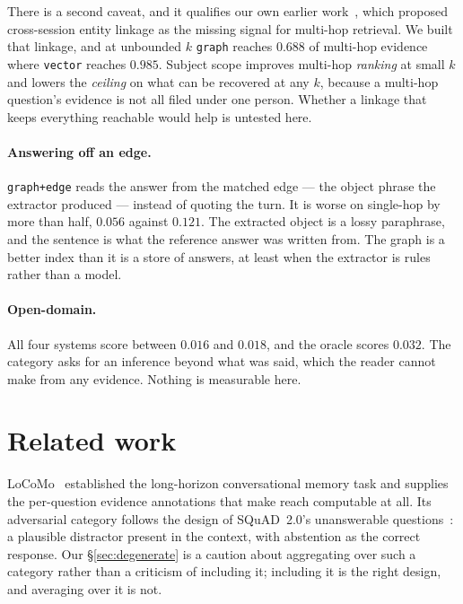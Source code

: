 \documentclass[11pt]{article}
\newcommand{\arm}[1]{\texttt{#1}}
\begin{document}
There is a second caveat, and it qualifies our own earlier
work~\cite{multihop}, which proposed cross-session entity linkage as the
missing signal for multi-hop retrieval. We built that linkage, and at unbounded
$k$ \arm{graph} reaches $0.688$ of multi-hop evidence where \arm{vector} reaches
$0.985$. Subject scope improves multi-hop \emph{ranking} at small $k$
and lowers the \emph{ceiling} on what can be recovered at any $k$, because a
multi-hop question's evidence is not all filed under one person. Whether a
linkage that keeps everything reachable would help is untested here.

\paragraph{Answering off an edge.} \arm{graph+edge} reads the answer from the
matched edge --- the object phrase the extractor produced --- instead of quoting
the turn. It is worse on single-hop by more than half, $0.056$ against $0.121$.
The extracted object is a lossy paraphrase, and the sentence is what the
reference answer was written from. The graph is a better index than it is a
store of answers, at least when the extractor is rules rather than a model.

\paragraph{Open-domain.} All four systems score between $0.016$ and $0.018$,
and the oracle scores $0.032$. The category asks for an inference beyond what
was said, which the reader cannot make from any evidence. Nothing is measurable
here.

\section{Related work}
\label{sec:related}

LoCoMo~\cite{locomo} established the long-horizon conversational memory task and
supplies the per-question evidence annotations that make reach computable at
all. Its adversarial category follows the design of SQuAD~2.0's unanswerable
questions~\cite{squad2}: a plausible distractor present in the context, with
abstention as the correct response. Our \S\ref{sec:degenerate} is a caution
about aggregating over such a category rather than a criticism of including it;
including it is the right design, and averaging over it is not.
\end{document}

